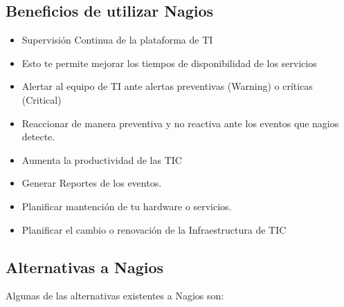 \documentclass[11pt,a4paper]{article}
\begin{document}
\subsection{Beneficios de utilizar Nagios}

\begin{itemize}
\item Supervisión Continua de la plataforma de TI
\item Esto te permite mejorar los tiempos de disponibilidad de los servicios
\item Alertar al equipo de TI ante alertas preventivas (Warning) o críticas (Critical)
\item Reaccionar de manera preventiva y no reactiva ante los eventos que nagios detecte.
\item Aumenta la productividad de las TIC
\item Generar Reportes de los eventos.
\item Planificar mantención de tu hardware o servicios.
\item Planificar el cambio o renovación de la Infraestructura de TIC
\end{itemize}    


\subsection{Alternativas a Nagios}

    Algunas de las alternativas existentes a Nagios son:
\end{document}
